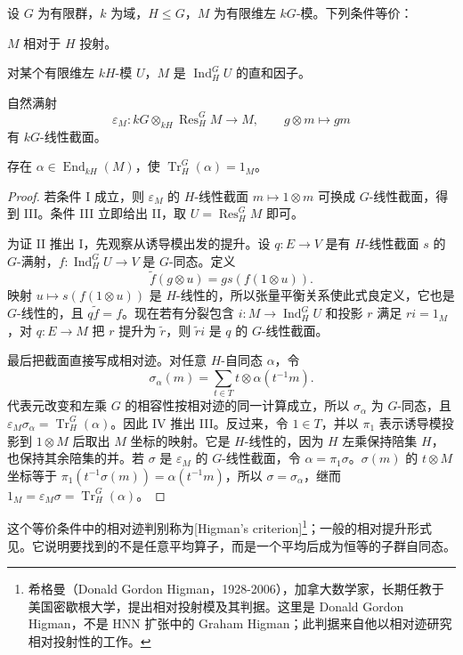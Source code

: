 \begin{theorem}[Higman 判据]\label{b5:thm:higman-criterion}
	设 \(G\) 为有限群，\(k\) 为域，\(H\le G\)，\(M\) 为有限维左 \(kG\)-模。下列条件等价：
	\begin{equivalences}
		\item \(M\) 相对于 \(H\) 投射。
		\item 对某个有限维左 \(kH\)-模 \(U\)，\(M\) 是 \(\operatorname{Ind}_H^G U\) 的直和因子。
		\item 自然满射
		\[
			\varepsilon_M:kG\otimes_{kH}\operatorname{Res}_H^G M\longrightarrow M,
			\qquad g\otimes m\longmapsto gm
		\]
		有 \(kG\)-线性截面。
		\item 存在 \(\alpha\in\operatorname{End}_{kH}(M)\)，使 \(\operatorname{Tr}_H^G(\alpha)=1_M\)。
	\end{equivalences}
\end{theorem}
\begin{proof}
	若条件 I 成立，则 \(\varepsilon_M\) 的 \(H\)-线性截面 \(m\mapsto1\otimes m\) 可换成 \(G\)-线性截面，得到 III。条件 III 立即给出 II，取 \(U=\operatorname{Res}_H^G M\) 即可。

	为证 II 推出 I，先观察从诱导模出发的提升。设 \(q:E\to V\) 是有 \(H\)-线性截面 \(s\) 的 \(G\)-满射，\(f:\operatorname{Ind}_H^G U\to V\) 是 \(G\)-同态。定义
	\[
		\widetilde f(g\otimes u)=g s(f(1\otimes u)).
	\]
	映射 \(u\mapsto s(f(1\otimes u))\) 是 \(H\)-线性的，所以张量平衡关系使此式良定义，它也是 \(G\)-线性的，且 \(q\widetilde f=f\)。现在若有分裂包含 \(i:M\to\operatorname{Ind}_H^G U\) 和投影 \(r\) 满足 \(ri=1_M\)，对 \(q:E\to M\) 把 \(r\) 提升为 \(\widetilde r\)，则 \(\widetilde r i\) 是 \(q\) 的 \(G\)-线性截面。

	最后把截面直接写成相对迹。对任意 \(H\)-自同态 \(\alpha\)，令
	\[
		\sigma_\alpha(m)=\sum_{t\in T}t\otimes\alpha(t^{-1}m).
	\]
	代表元改变和左乘 \(G\) 的相容性按相对迹的同一计算成立，所以 \(\sigma_\alpha\) 为 \(G\)-同态，且 \(\varepsilon_M\sigma_\alpha=\operatorname{Tr}_H^G(\alpha)\)。因此 IV 推出 III。反过来，令 \(1\in T\)，并以 \(\pi_1\) 表示诱导模投影到 \(1\otimes M\) 后取出 \(M\) 坐标的映射。它是 \(H\)-线性的，因为 \(H\) 左乘保持陪集 \(H\)，也保持其余陪集的并。若 \(\sigma\) 是 \(\varepsilon_M\) 的 \(G\)-线性截面，令 \(\alpha=\pi_1\sigma\)。\(\sigma(m)\) 的 \(t\otimes M\) 坐标等于 \(\pi_1(t^{-1}\sigma(m))=\alpha(t^{-1}m)\)，所以 \(\sigma=\sigma_\alpha\)，继而 \(1_M=\varepsilon_M\sigma=\operatorname{Tr}_H^G(\alpha)\)。
\end{proof}

这个等价条件中的相对迹判别称为[Higman's criterion]\footnote{希格曼（Donald Gordon Higman，1928-2006），加拿大数学家，长期任教于美国密歇根大学，提出相对投射模及其判据。这里是 Donald Gordon Higman，不是 HNN 扩张中的 Graham Higman；此判据来自他以相对迹研究相对投射性的工作。}；一般的相对提升形式见\cite[Proposition 11.3.4]{Webb2016FiniteGroupRepresentations}。它说明要找到的不是任意平均算子，而是一个平均后成为恒等的子群自同态。


